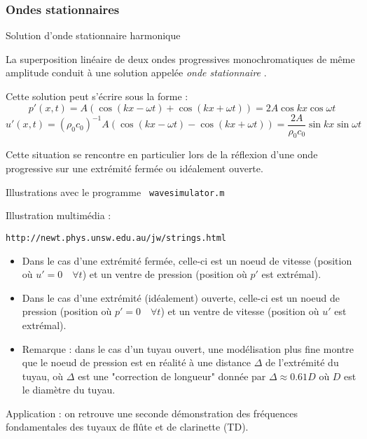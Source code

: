 \subsubsection{Ondes stationnaires}
\begin{frame}[fragile]{Solution d'onde stationnaire harmonique}

\small

\bigskip

La superposition linéaire de deux ondes progressives monochromatiques de même amplitude conduit à une solution appelée
{\em onde stationnaire }.

\medskip
Cette solution peut s'écrire sous la forme : 
$$
p'(x,t) = A \left( \cos (kx - \omega t) + \cos ( kx + \omega t) \right) = 2 A \cos k x \cos \omega t
$$
$$
u'(x,t) = (\rho_0 c_0)^{-1} A \left( \cos (kx - \omega t) - \cos ( kx + \omega t)  \right) = \frac{2 A}{\rho_0 c_0} 
\sin k x \sin \omega t
$$

Cette situation se rencontre en particulier lors de la réflexion d'une onde progressive sur une extrémité fermée ou idéalement ouverte.

\bigskip

 
{\color{blue} 

 Illustrations avec le programme \verb| wavesimulator.m |

 Illustration multimédia :
{\scriptsize
\begin{verbatim}
http://newt.phys.unsw.edu.au/jw/strings.html
\end{verbatim}
}

}
\pause
\medskip

\begin{itemize}

\item Dans le cas d'une extrémité fermée, celle-ci est un noeud de vitesse (position où $u'=0 \quad \forall t$)  et un ventre de pression (position où $p'$ est extrémal).

\pause
\medskip

\item  Dans le cas d'une extrémité (idéalement) ouverte, celle-ci est un noeud de pression (position où $p'=0 \quad \forall t$)  et un ventre de vitesse (position où $u'$ est extrémal).


\item { \color{vert} Remarque : dans le cas d'un tuyau ouvert, une modélisation plus fine montre que le noeud de pression est en réalité à une distance $\Delta$
de l'extrémité du tuyau, où $\Delta$ est une "correction de longueur" donnée par 
 $\Delta \approx 0.61 D$ où $D$ est le diamètre du tuyau.
}

\end{itemize}

\medskip

Application : on retrouve une seconde démonstration des fréquences fondamentales des tuyaux de flûte et de clarinette (TD).

\vspace{39mm}

\end{frame}

